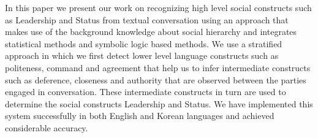 In this paper we present our work on recognizing high level social constructs such as Leadership and Status from textual conversation using an approach that makes use of the background knowledge about social hierarchy and integrates statistical methods and symbolic logic based methods. We use a stratified approach in which we first detect lower level language constructs such as politeness, command and agreement that help us to infer intermediate constructs such as deference, closeness and authority that are observed between the parties engaged in conversation. These intermediate constructs in turn are used to determine the social constructs Leadership and Status. We have implemented this system successfully in both English and Korean languages and achieved considerable accuracy.

